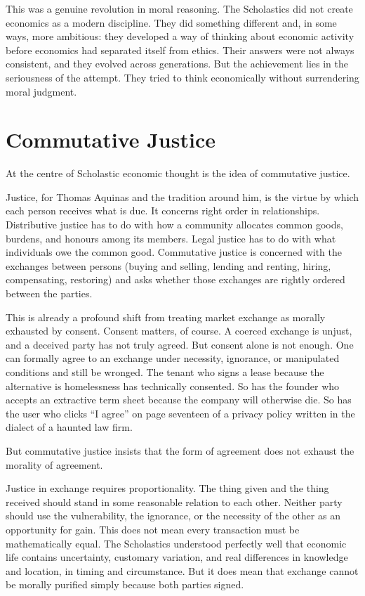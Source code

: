 \documentclass[11pt,a4paper,oneside]{book}
\begin{document}
This was a genuine revolution in moral reasoning. The Scholastics did not create economics as a modern discipline. They did something different and, in some ways, more ambitious: they developed a way of thinking about economic activity before economics had separated itself from ethics. Their answers were not always consistent, and they evolved across generations. But the achievement lies in the seriousness of the attempt. They tried to think economically without surrendering moral judgment.

\section*{Commutative Justice}

At the centre of Scholastic economic thought is the idea of commutative justice.

Justice, for Thomas Aquinas and the tradition around him, is the virtue by which each person receives what is due. It concerns right order in relationships. Distributive justice has to do with how a community allocates common goods, burdens, and honours among its members. Legal justice has to do with what individuals owe the common good. Commutative justice is concerned with the exchanges between persons (buying and selling, lending and renting, hiring, compensating, restoring) and asks whether those exchanges are rightly ordered between the parties.

This is already a profound shift from treating market exchange as morally exhausted by consent. Consent matters, of course. A coerced exchange is unjust, and a deceived party has not truly agreed. But consent alone is not enough. One can formally agree to an exchange under necessity, ignorance, or manipulated conditions and still be wronged. The tenant who signs a lease because the alternative is homelessness has technically consented. So has the founder who accepts an extractive term sheet because the company will otherwise die. So has the user who clicks ``I agree'' on page seventeen of a privacy policy written in the dialect of a haunted law firm.

But commutative justice insists that the form of agreement does not exhaust the morality of agreement.

Justice in exchange requires proportionality. The thing given and the thing received should stand in some reasonable relation to each other. Neither party should use the vulnerability, the ignorance, or the necessity of the other as an opportunity for gain. This does not mean every transaction must be mathematically equal. The Scholastics understood perfectly well that economic life contains uncertainty, customary variation, and real differences in knowledge and location, in timing and circumstance. But it does mean that exchange cannot be morally purified simply because both parties signed.
\end{document}
